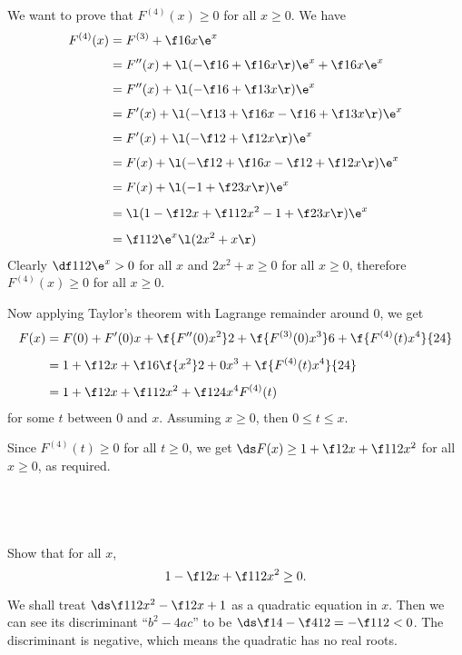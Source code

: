 \documentclass[a4paper]{article}
\begin{document}
We want to prove that $F^{(4)}(x) \ge 0$ for all $x \ge 0$. We have \begin{align*}
F^{(4)}(x) &= F^{(3)} + \f16 x \e^x \\[1ex]
&= F''(x) + \l( - \f16 + \f16 x \r) \e^x + \f16 x \e^x \\[1ex]
&= F''(x) + \l( - \f16 + \f13 x \r) \e^x \\[1ex]
&= F'(x) + \l( - \f13 + \f16 x - \f16 + \f13 x \r) \e^x \\[1ex]
&= F'(x) + \l( - \f12 + \f12 x \r) \e^x \\[1ex]
&= F(x) + \l( - \f12 + \f16 x - \f12 + \f12 x \r) \e^x \\[1ex]
&= F(x) + \l( - 1 + \f23 x \r) \e^x \\[1ex]
&= \l( 1 - \f12 x + \f1{12} x^2 - 1 + \f23 x \r) \e^x \\[1ex]
&= \f1{12} \e^x \l( 2 x^2 + x \r)
\end{align*}
Clearly $\df1{12} \e^x > 0$ for all $x$ and $2 x^2 + x \ge 0$ for all $x \ge 0$, therefore $F^{(4)}(x) \ge 0$ for all $x \ge 0$.

Now applying Taylor's theorem with Lagrange remainder around 0, we get \begin{align*}
F(x) &= F(0) + F'(0) x + \f{F''(0) x^2}2 + \f{F^{(3)}(0) x^3}6 + \f{F^{(4)}(t) x^4}{24} \\[1ex]
&= 1 + \f12 x + \f16 \f{x^2}2 + 0 x^3 + \f{F^{(4)}(t) x^4}{24} \\[1ex]
&= 1 + \f12 x + \f1{12} x^2 + \f1{24} x^4 F^{(4)}(t)
\end{align*}
for some $t$ between $0$ and $x$. Assuming $x \ge 0$, then $0 \le t \le x$.

Since $F^{(4)}(t) \ge 0$ for all $t \ge 0$, we get $\ds F(x) \ge 1 + \f12 x + \f1{12} x^2$ for all $x \ge 0$, as required.

\subsection{~} %

\begin{questionbody}
Show that for all $x$, \[
1 - \f12 x + \f1{12} x^2 \ge 0.
\]
\end{questionbody}

We shall treat $\ds \f1{12} x^2 - \f12 x + 1$ as a quadratic equation in $x$. Then we can see its discriminant \enquote{$b^2 - 4ac$} to be $\ds \f14 - \f4{12} = -\f1{12} < 0$. The discriminant is negative, which means the quadratic has no real roots.
\end{document}
